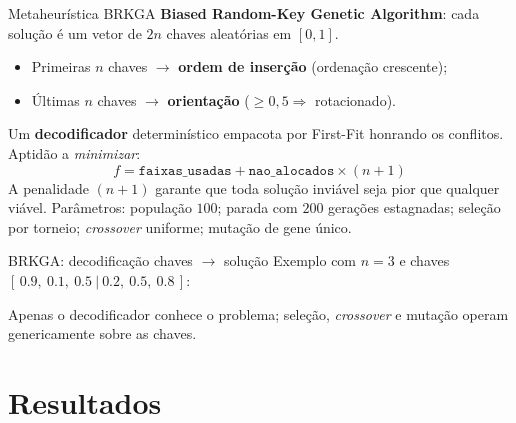 \documentclass[aspectratio=169]{beamer}
\begin{document}
\begin{frame}{Metaheurística BRKGA}
  \textbf{Biased Random-Key Genetic Algorithm}: cada solução é um vetor de
  $2n$ chaves aleatórias em $[0,1]$.
  \begin{itemize}
    \item Primeiras $n$ chaves $\rightarrow$ \textbf{ordem de inserção}
          (ordenação crescente);
    \item Últimas $n$ chaves $\rightarrow$ \textbf{orientação}
          ($\ge 0{,}5 \Rightarrow$ rotacionado).
  \end{itemize}
  Um \textbf{decodificador} determinístico empacota por First-Fit honrando os
  conflitos. Aptidão a \emph{minimizar}:
  \[
    f = \texttt{faixas\_usadas} + \texttt{nao\_alocados}\times(n+1)
  \]
  A penalidade $(n+1)$ garante que toda solução inviável seja pior que qualquer
  viável.
  \vspace{0.4em}
  \footnotesize Parâmetros: população $100$; parada com $200$ gerações
  estagnadas; seleção por torneio; \textit{crossover} uniforme; mutação de gene
  único.
\end{frame}

\begin{frame}{BRKGA: decodificação chaves $\rightarrow$ solução}
  \centering
  \footnotesize Exemplo com $n=3$ e chaves $[\,0.9,\ 0.1,\ 0.5\ |\ 0.2,\ 0.5,\ 0.8\,]$:
  \vspace{0.6em}

  \vspace{0.6em}

  \normalsize Apenas o decodificador conhece o problema; seleção, \textit{crossover}
  e mutação operam genericamente sobre as chaves.
\end{frame}

\section{Resultados}
\end{document}
